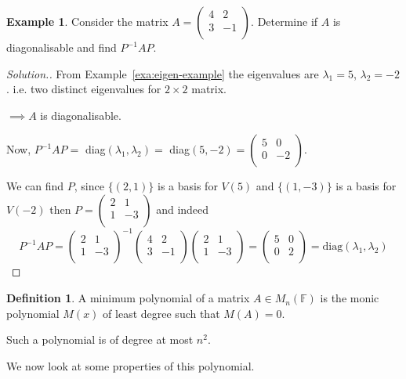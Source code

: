\documentclass[11pt,a4paper]{article}
\theoremstyle{definition}
\newtheorem{defn}[thm]{Definition}
\newtheorem{exa}[thm]{Example}
\newenvironment{solution}
  {\renewcommand{\qedsymbol}{}\begin{proof}[\textit{Solution}.]}
  {\end{proof}}
\begin{document}
\begin{exa}
Consider the matrix $A=
\begin{pmatrix}
4&2\\3&-1\\
\end{pmatrix}
$. Determine if $A$ is diagonalisable and find $P^{-1}AP$.
\end{exa}


\begin{solution}
From Example~\ref{exa:eigen-example} the eigenvalues are $\lambda_1=5$, $\lambda_2=-2$. i.e. two distinct eigenvalues for $2\times 2$ matrix.

$\implies A$ is diagonalisable.

Now, $P^{-1}AP=$ diag$(\lambda_1,\lambda_2)=$ diag$(5,-2)=
\begin{pmatrix}
5&0\\0&-2\\
\end{pmatrix}
$.

We can find $P$, since $\{(2,1)\}$ is a basis for $V(5)$ and $\{(1,-3)\}$ is a basis for $V(-2)$ then $P=
\begin{pmatrix}
2&1\\1&-3\\
\end{pmatrix}
$  and indeed
$$ P^{-1}AP=
\begin{pmatrix}
2&1\\1&-3\\
\end{pmatrix}^{-1}
\begin{pmatrix}
4&2\\3&-1\\
\end{pmatrix}
\begin{pmatrix}
2&1\\1&-3\\
\end{pmatrix}
=\begin{pmatrix}
5&0\\0&2\\
\end{pmatrix}
=\text{diag}(\lambda_1,\lambda_2)
$$
\end{solution}


\begin{defn}
A minimum polynomial of a matrix $A\in M_n(\mathbb{F})$ is the monic polynomial $M(x)$ of least degree such that $M(A)=0$.

Such a polynomial is of degree at most $n^2$.

\end{defn}
 We now look at some properties of this polynomial.
\end{document}

